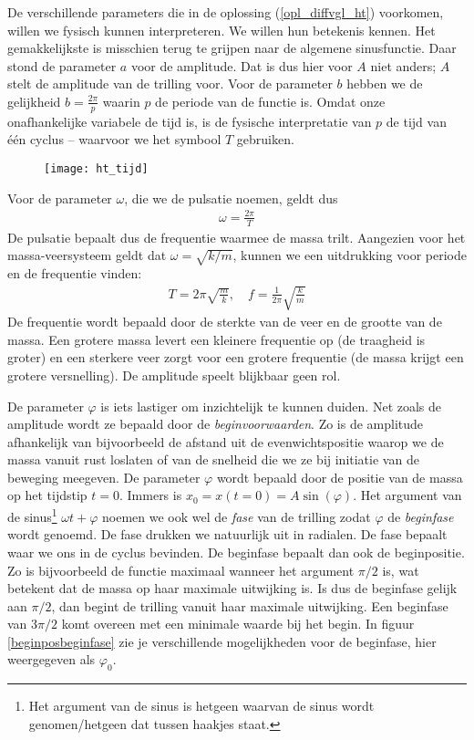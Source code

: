\documentclass{ximera}
\begin{document}
	De verschillende parameters die in de oplossing (\ref{opl_diffvgl_ht}) voorkomen, willen we fysisch kunnen interpreteren. We willen hun betekenis kennen. Het gemakkelijkste is misschien terug te grijpen naar de algemene sinusfunctie. Daar stond de parameter $a$ voor de amplitude. Dat is dus hier voor $A$ niet anders; $A$ stelt de amplitude van de trilling voor. Voor de parameter $b$ hebben we de gelijkheid $b=\frac{2\pi}{p}$ waarin $p$ de periode van de functie is. Omdat onze onafhankelijke variabele de tijd is, is de fysische interpretatie van $p$ de tijd van \'e\'en cyclus -- waarvoor we het symbool $T$ gebruiken. 
	\begin{figure}[h]
	\centering
	\texttt{[image: ht\_tijd]}
	\end{figure}
	Voor de parameter $\omega$, die we de pulsatie noemen, geldt dus
	\begin{eqnarray*}
	\omega=\frac{2\pi}{T}
	\end{eqnarray*}
	De pulsatie bepaalt dus de frequentie waarmee de massa trilt. Aangezien voor het massa-veersysteem geldt dat $\omega=\sqrt{k/m}$, kunnen we een uitdrukking voor periode en de frequentie vinden:
	\begin{eqnarray*}
	T=2\pi\sqrt{\frac{m}{k}},\quad f=\frac{1}{2\pi}\sqrt{\frac{k}{m}}
	\end{eqnarray*}
	De frequentie wordt bepaald door de sterkte van de veer en de grootte van de massa. Een grotere massa levert een kleinere frequentie op (de traagheid is groter) en een sterkere veer zorgt voor een grotere frequentie (de massa krijgt een grotere versnelling). De amplitude speelt blijkbaar geen rol.
	
	De parameter $\varphi$ is iets lastiger om inzichtelijk te kunnen duiden. Net zoals de amplitude wordt ze bepaald door de \emph{beginvoorwaarden}. Zo is de amplitude afhankelijk van bijvoorbeeld de afstand uit de evenwichtspositie waarop we de massa vanuit rust loslaten of van de snelheid die we ze bij initiatie van de beweging meegeven. De parameter $\varphi$ wordt bepaald door de positie van de massa op het tijdstip $t=0$. Immers is $x_0=x(t=0)=A\sin(\varphi)$. Het argument van de sinus\footnote{Het argument van de sinus is hetgeen waarvan de sinus wordt genomen/hetgeen dat tussen haakjes staat.} $\omega t+\varphi$ noemen we ook wel de \emph{fase} van de trilling zodat $\varphi$ de \emph{beginfase} wordt genoemd. De fase drukken we natuurlijk uit in radialen. De fase bepaalt waar we ons in de cyclus bevinden. 
	De beginfase bepaalt dan ook de beginpositie. Zo is bijvoorbeeld de functie maximaal wanneer het argument $\pi/2$ is, wat betekent dat de massa op haar maximale uitwijking is. Is dus de beginfase gelijk aan $\pi/2$, dan begint de trilling vanuit haar maximale uitwijking. Een beginfase van $3\pi/2$ komt overeen met een minimale waarde bij het begin. In figuur \ref{beginposbeginfase} zie je verschillende mogelijkheden voor de beginfase, hier weergegeven als $\varphi_0$.
	
\end{document}
